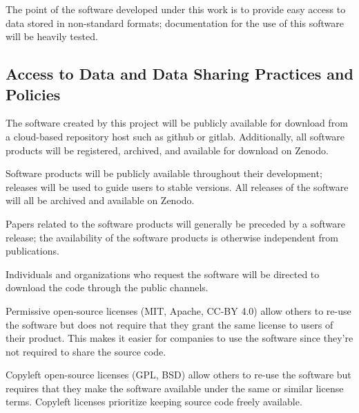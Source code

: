 \documentclass[11pt]{article}
\begin{document}
The point of the software developed under this work is to provide easy access to data stored in non-standard formats; documentation for the use of this software will be heavily tested.


\subsection{Access to Data and Data Sharing Practices and Policies}
The software created by this project will be publicly available for download from a cloud-based repository host such as github or gitlab.  Additionally, all software products will be registered, archived, and available for download on Zenodo.

Software products will be publicly available throughout their development; releases will be used to guide users to stable versions.  All releases of the software will all be archived and available on Zenodo.

Papers related to the software products will generally be preceded by a software release; the availability of the software products is otherwise independent from publications.

Individuals and organizations who request the software will be directed to download the code through the public channels.


Permissive open-source licenses (MIT, Apache, CC-BY 4.0) allow others to re-use the software but does not require that they grant the same license to users of their product.  This makes it easier for companies to use the software since they're not required to share the source code.

Copyleft open-source licenses (GPL, BSD) allow others to re-use the software but requires that they make the software available under the same or similar license terms.  Copyleft licenses prioritize keeping source code freely available.
\end{document}
